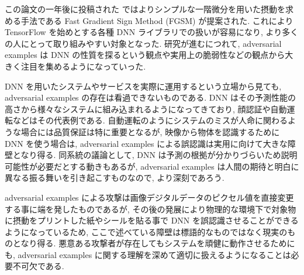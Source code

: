 この論文の一年後に投稿された \cite{goodfellow2014explaining} ではよりシンプルな一階微分を用いた摂動を求める手法である Fast Gradient Sign Method (FGSM) が提案された.
これにより TensorFlow \cite{abadi2016tensorflow} を始めとする各種 DNN ライブラリでの扱いが容易になり, より多くの人にとって取り組みやすい対象となった.
研究が進むにつれて, adversarial examples は DNN の性質を探るという観点や実用上の脆弱性などの観点から大きく注目を集めるようになっていった.

DNN を用いたシステムやサービスを実際に運用するという立場から見ても, adversarial examples の存在は看過できないものである.
DNN はその予測性能の高さから様々なシステムに組み込まれるようになってきており, 顔認証や自動運転などはその代表例である.
自動運転のようにシステムのミスが人命に関わるような場合には品質保証は特に重要となるが, 映像から物体を認識するために DNN を使う場合は, adversarial examples による誤認識は実用に向けて大きな障壁となり得る.
同系統の議論として, DNN は予測の根拠が分かりづらいため説明可能性が必要だとする動きもあるが, adversarial examples は人間の期待と明白に異なる振る舞いを引き起こすものなので, より深刻であろう.

adversarial examples による攻撃は画像デジタルデータのピクセル値を直接変更する事に端を発したものであるが, その後の発展により物理的な環境下で対象物に摂動をプリントした紙やシールを貼る事で DNN を誤認識させることができるようになっているため, ここで述べている障壁は標語的なものではなく現実のものとなり得る.
悪意ある攻撃者が存在してもシステムを頑健に動作させるためにも, adversarial examples に関する理解を深めて適切に扱えるようになることは必要不可欠である.



